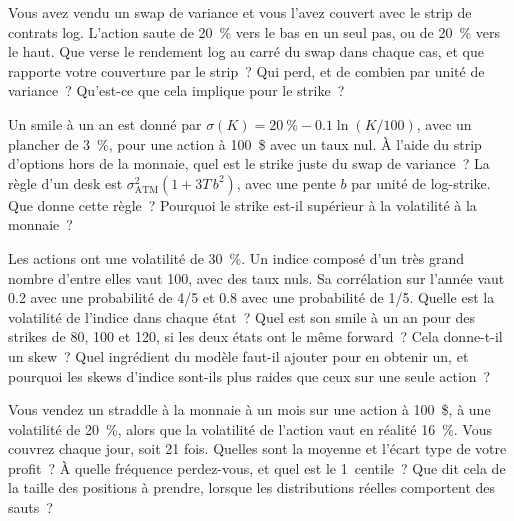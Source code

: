 \begin{question}\label{iq:iv2:vol-surface-and-vol-trading:34}
Vous avez vendu un swap de variance et vous l'avez couvert avec le strip de contrats log. L'action saute de 20~\% vers le bas en un seul pas, ou de 20~\% vers le haut. Que verse le rendement log au carré du swap dans chaque cas, et que rapporte votre couverture par le strip~? Qui perd, et de combien par unité de variance~? Qu'est-ce que cela implique pour le strike~?
\end{question}

\begin{question}\label{iq:iv2:vol-surface-and-vol-trading:35}
Un smile à un an est donné par $\sigma(K) = 20~\% - 0.1\ln(K/100)$, avec un plancher de 3~\%, pour une action à 100~\$ avec un taux nul. À l'aide du strip d'options hors de la monnaie, quel est le strike juste du swap de variance~? La règle d'un desk est $\sigma_{\text{ATM}}^2(1 + 3T\,b^2)$, avec une pente $b$ par unité de log-strike. Que donne cette règle~? Pourquoi le strike est-il supérieur à la volatilité à la monnaie~?
\end{question}

\begin{question}\label{iq:iv2:vol-surface-and-vol-trading:36}
Les actions ont une volatilité de 30~\%. Un indice composé d'un très grand nombre d'entre elles vaut 100, avec des taux nuls. Sa corrélation sur l'année vaut 0.2 avec une probabilité de 4/5 et 0.8 avec une probabilité de 1/5. Quelle est la volatilité de l'indice dans chaque état~? Quel est son smile à un an pour des strikes de 80, 100 et 120, si les deux états ont le même forward~? Cela donne-t-il un skew~? Quel ingrédient du modèle faut-il ajouter pour en obtenir un, et pourquoi les skews d'indice sont-ils plus raides que ceux sur une seule action~?
\end{question}

\begin{question}\label{iq:iv2:vol-surface-and-vol-trading:37}
Vous vendez un straddle à la monnaie à un mois sur une action à 100~\$, à une volatilité de 20~\%, alors que la volatilité de l'action vaut en réalité 16~\%. Vous couvrez chaque jour, soit 21 fois. Quelles sont la moyenne et l'écart type de votre profit~? À quelle fréquence perdez-vous, et quel est le 1~centile~? Que dit cela de la taille des positions à prendre, lorsque les distributions réelles comportent des sauts~?
\end{question}

